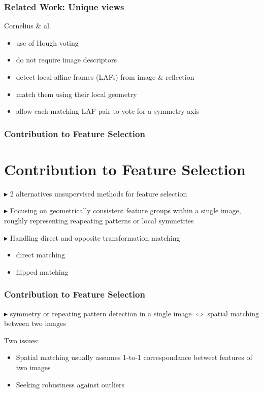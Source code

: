 \documentclass[11pt]{beamer}
\begin{document}
\begin{frame}
\frametitle{Related Work: Unique views}
Cornelius \& al.
\begin{itemize}
\item use of Hough voting
\item do not require image descriptors
\item detect local affine frames (LAFs) from image \& reflection
\item match them using their local geometry
\item allow each matching LAF pair to vote for a symmetry axis
\end{itemize}
\end{frame}

\begin{frame}
\frametitle{Contribution to Feature Selection}
\section{Contribution to Feature Selection}
$\blacktriangleright$ 2 alternatives unsupervised methods for feature selection

\vspace{0.3cm}

$\blacktriangleright$ Focusing on geometrically consistent feature groups within a single image, roughly representing reapeating patterns or local symmetries

\vspace{0.3cm}

$\blacktriangleright$ Handling direct and opposite transformation matching
\begin{itemize}
\item direct matching
\item flipped matching
\end{itemize}
\end{frame}

\begin{frame}
\frametitle{Contribution to Feature Selection}
$\blacktriangleright$ symmetry or repeating pattern detection in a single image \newline{} $\Leftrightarrow$ spatial matching between two images

\vspace{0.3cm}
Two issues:
\begin{itemize}
\item Spatial matching usually assumes 1-to-1 correspondance betweet features of two images
\item Seeking robustness against outliers
\end{itemize}
\end{frame}
\end{document}
